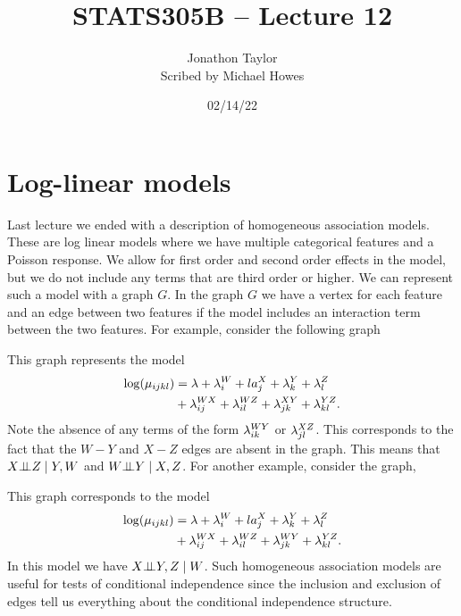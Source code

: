 




\title{STATS305B -- Lecture 12}
\author{Jonathon Taylor\\ Scribed by Michael Howes}
\date{02/14/22}

\pagestyle{fancy}
\fancyhf{}


\maketitle
\tableofcontents

\section{Log-linear models}
Last lecture we ended with a description of homogeneous association models. These are log linear models where we have multiple categorical features and a Poisson response. We allow for first order and second order effects in the model,  but we do not include any terms that are third order or higher. We can represent such a model with a graph $G$. In the graph $G$ we have a vertex for each feature and an edge between two features if the model includes an interaction term between the two features. For example, consider the following graph 

\begin{center}
    
\end{center}
This graph represents the model 
\begin{align*}
    \log(\mu_{ijkl})&=\lambda + \lambda^W_i+la^X_j+\lambda^Y_k+\lambda^Z_l\\
    &+\lambda^{WX}_{ij}+\lambda^{WZ}_{il}+\lambda^{XY}_{jk}+\lambda^{YZ}_{kl}.
\end{align*}
Note the absence of any terms of the form $\lambda^{WY}_{ik}$ or $\lambda^{XZ}_{jl}$. This corresponds to the fact that the $W-Y$ and $X-Z$ edges are absent in the graph. This means that $X {\perp\!\!\!\perp} Z \mid Y,W$ and $W {\perp\!\!\!\perp} Y \mid X,Z$. For another example, consider the graph,

\begin{center}
    
\end{center}
This graph corresponds to the model
\begin{align*}
    \log(\mu_{ijkl})&=\lambda + \lambda^W_i+la^X_j+\lambda^Y_k+\lambda^Z_l\\
    &+\lambda^{WX}_{ij}+\lambda^{WZ}_{il}+\lambda^{WY}_{jk}+\lambda^{YZ}_{kl}.
\end{align*}
In this model we have $X {\perp\!\!\!\perp} Y,Z\mid W$. Such homogeneous association models are useful for tests of conditional independence since the inclusion and exclusion of edges tell us everything about the conditional independence structure. 
